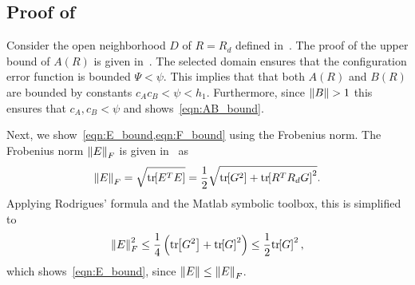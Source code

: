 \subsection{Proof of~}\label{proof:eR_dot_bound}


Consider the open neighborhood $D$ of $R=R_d$ defined in~.
The proof of the upper bound of \( A(R) \) is given in~\cite{LeeITCST13}.
The selected domain ensures that the configuration error function is bounded \( \Psi < \psi \).
This implies that that both \( A(R) \) and \( B(R) \) are bounded by constants \( c_A c_B < \psi < h_1\).
Furthermore, since \( \left\| B \right\| > 1 \) this ensures that \( c_A, c_B < \psi\) and shows~\cref{eqn:AB_bound}.

Next, we show~\cref{eqn:E_bound,eqn:F_bound} using the Frobenius norm.
The Frobenius norm \( \left\| E \right\|_F \) is given in~\cite{LeeITCST13} as
\begin{gather*}
	\left\| E \right\|_F = \sqrt{\mathrm{tr}\negthickspace\left[ E^T E \right]} = \frac{1}{2} \sqrt{\mathrm{tr}\negthickspace\left[ G^2 \right] + \mathrm{tr}\negthickspace\left[ R^T R_d G \right]^2} .
\end{gather*}
Applying Rodrigues' formula and the Matlab symbolic toolbox, this is simplified to
\begin{gather*}
	\left\| E \right\|^2_F \leq \frac{1}{4} \left( \mathrm{tr}\negthickspace\left[ G^2 \right] + \mathrm{tr}\negthickspace\left[ G \right]^2 \right) \leq \frac{1}{2} \mathrm{tr}\negthickspace\left[ G \right]^2 ,
\end{gather*}
which shows~\cref{eqn:E_bound}, since \( \left\| E \right\| \leq \left\| E \right\|_F \).

